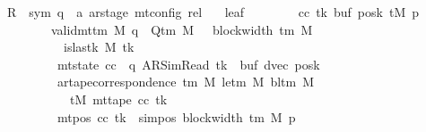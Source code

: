 \begin{isabellebody}
\ \ \ \ \ R{\isacharprime}{\kern0pt}\ {\isacharcolon}{\kern0pt}{\isacharcolon}{\kern0pt}\ {\isachardoublequoteopen}{\isacharparenleft}{\kern0pt}sym{}{\isacharcomma}{\kern0pt}\ {\isacharprime}{\kern0pt}q\ {\isasymtimes}\ {\isacharprime}{\kern0pt}a\ ar{\isacharunderscore}{\kern0pt}stage{\isacharparenright}{\kern0pt}\ mt{\isacharunderscore}{\kern0pt}config\ rel{\isachardoublequoteclose}\isanewline
\ \ \ leaf{\isacharcolon}{\kern0pt}\isanewline
\ \ \ \ \ \ \ \ {\isachardoublequoteopen}{\isasymAnd}cc\ tk{\isacharprime}{\kern0pt}\ buf{\isacharprime}{\kern0pt}\ posk{\isacharprime}{\kern0pt}\ tM{\isacharprime}{\kern0pt}\ p{\isacharprime}{\kern0pt}{\isachardot}{\kern0pt}\isanewline
\ \ \ \ \ \ \ \ \ \ \ {\isasymlbrakk}\ valid{\isacharunderscore}{\kern0pt}mttm\ M{\isacharsemicolon}{\kern0pt}\ q\ {\isasymin}\ Q{\isacharunderscore}{\kern0pt}tm\ M{\isacharsemicolon}{\kern0pt}\ {}\ {\isasymle}\ block{\isacharunderscore}{\kern0pt}width\ {\isacharparenleft}{\kern0pt}{\isasymGamma}{\isacharunderscore}{\kern0pt}tm\ M{\isacharparenright}{\kern0pt}{\isacharsemicolon}{\kern0pt}\isanewline
\ \ \ \ \ \ \ \ \ \ \ \ \ {\isasymnot}\ is{\isacharunderscore}{\kern0pt}last{\isacharunderscore}{\kern0pt}k\ M\ tk{\isacharprime}{\kern0pt}{\isacharsemicolon}{\kern0pt}\isanewline
\ \ \ \ \ \ \ \ \ \ \ \ \ mt{\isacharunderscore}{\kern0pt}state\ cc\ {\isacharequal}{\kern0pt}\ {\isacharparenleft}{\kern0pt}q{\isacharcomma}{\kern0pt}\ AR{\isacharunderscore}{\kern0pt}SimRead{\isacharcomma}{\kern0pt}\ tk{\isacharprime}{\kern0pt}{\isacharcomma}{\kern0pt}\ {}{\isacharcomma}{\kern0pt}\ buf{\isacharprime}{\kern0pt}{\isacharcomma}{\kern0pt}\ dvec{\isacharcomma}{\kern0pt}\ posk{\isacharprime}{\kern0pt}{\isacharparenright}{\kern0pt}{\isacharsemicolon}{\kern0pt}\isanewline
\ \ \ \ \ \ \ \ \ \ \ \ \ ar{\isacharunderscore}{\kern0pt}tape{\isacharunderscore}{\kern0pt}correspondence\ {\isacharparenleft}{\kern0pt}{\isasymGamma}{\isacharunderscore}{\kern0pt}tm\ M{\isacharparenright}{\kern0pt}\ {\isacharparenleft}{\kern0pt}le{\isacharunderscore}{\kern0pt}tm\ M{\isacharparenright}{\kern0pt}\ {\isacharparenleft}{\kern0pt}bl{\isacharunderscore}{\kern0pt}tm\ M{\isacharparenright}{\kern0pt}\isanewline
\ \ \ \ \ \ \ \ \ \ \ \ \ \ \ tM{\isacharprime}{\kern0pt}\ {\isacharparenleft}{\kern0pt}mt{\isacharunderscore}{\kern0pt}tape\ cc\ tk{\isacharprime}{\kern0pt}{\isacharparenright}{\kern0pt}{\isacharsemicolon}{\kern0pt}\isanewline
\ \ \ \ \ \ \ \ \ \ \ \ \ mt{\isacharunderscore}{\kern0pt}pos\ cc\ tk{\isacharprime}{\kern0pt}\ {\isacharequal}{\kern0pt}\ sim{\isacharunderscore}{\kern0pt}pos\ {\isacharparenleft}{\kern0pt}block{\isacharunderscore}{\kern0pt}width\ {\isacharparenleft}{\kern0pt}{\isasymGamma}{\isacharunderscore}{\kern0pt}tm\ M{\isacharparenright}{\kern0pt}{\isacharparenright}{\kern0pt}\ p{\isacharprime}{\kern0pt}{\isacharsemicolon}{\kern0pt}\isanewline

\end{isabellebody}
